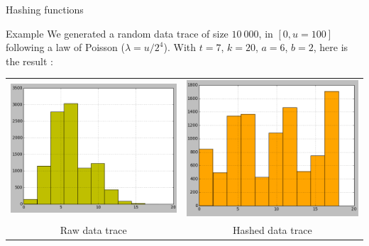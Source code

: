\documentclass[mathserif]{beamer}
\begin{document}
	\begin{frame}{Hashing functions}
	
	\begin{exampleblock}{Example}
	We generated a random data trace of size $10~000$, in $\left[0, u = 100\right]$ following a law of Poisson ($\lambda = u/2^4$). With $t=7$, $k=20$, $a=6$, $b=2$, here is the result :
	
	\begin{center}
	\begin{tabular}{cc}
		\includegraphics[scale=0.25]{poisson4.png} &
		\includegraphics[scale=0.25]{poisson4_hashed.png} \\
		Raw data trace & Hashed data trace \\
	\end{tabular}
	\end{center}
	
	\end{exampleblock}

	
	\end{frame}
	
\end{document}
